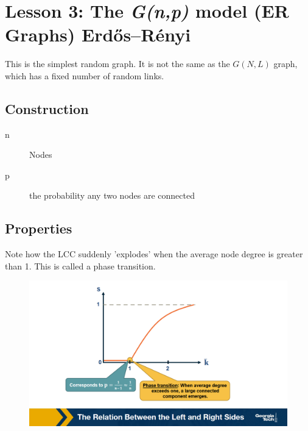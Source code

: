 \documentclass[crop=false]{standalone}
\begin{document}
\section{Lesson 3: The \textit{G(n,p)} model (ER Graphs) Erdős–Rényi}
This is the simplest random graph. It is not the same as the $G(N,L)$ graph, which has a fixed number of random links.
\subsection{Construction}
\begin{description}
    \item [n] Nodes
    \item [p] the probability any two nodes are connected 
\end{description}

\subsection{Properties}
Note how the LCC suddenly 'explodes' when the average node degree is greater than 1. This is called a phase transition. 
\begin{figure}
    \centering
    \includegraphics[width=1\linewidth]{lcc-explosion.png}
\end{figure}
\end{document}

